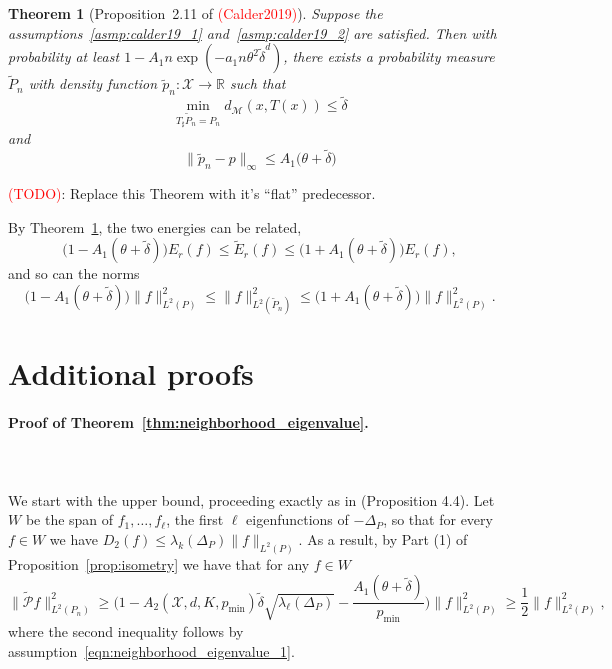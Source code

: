 \documentclass{article}
\newcommand{\Reals}{\mathbb{R}}
\newcommand{\1}{\mathbf{1}}
\newcommand{\Xset}{\mathcal{X}}
\newcommand{\Leb}{L}
\newcommand{\mc}[1]{\mathcal{#1}}
\newcommand{\wt}[1]{\widetilde{#1}}
\theoremstyle{alden}
\theoremstyle{aldenthm}
\newtheorem{theorem}{Theorem}
\theoremstyle{definition}
\theoremstyle{remark}
\begin{document}
\begin{theorem}[Proposition~2.11 of \textcolor{red}{(Calder2019)}]
	\label{thm:calder19_2}
	Suppose the assumptions~\ref{asmp:calder19_1} and~\ref{asmp:calder19_2} are satisfied. Then with probability at least $1 - A_1n\exp(-a_1n\theta^2\wt{\delta}^d)$, there exists a probability measure $\wt{P}_n$ with density function $\wt{p}_n: \Xset \to \Reals$ such that
	\begin{equation*}
	\min_{T_{\sharp}\wt{P}_n = P_n} d_{\mc{M}}(x,T(x)) \leq \wt{\delta}
	\end{equation*}
	and
	\begin{equation*}
	\bigl\|\wt{p}_n - p\bigr\|_{\infty} \leq A_1\bigl(\theta + \wt{\delta}\bigr)
	\end{equation*}
\end{theorem}
\textcolor{red}{(TODO)}: Replace this Theorem with it's ``flat'' predecessor.

By Theorem~\ref{thm:calder19_2}, the two energies can be related,
\begin{equation}
\label{eqn:calder19_1}
\bigl(1 - A_1(\theta + \wt{\delta})\bigr) E_r(f) \leq \wt{E}_r(f) \leq \bigl(1 + A_1(\theta + \wt{\delta})\bigr) E_r(f),
\end{equation}
and so can the norms
\begin{equation}
\label{eqn:calder19_2}
\bigl(1 - A_1(\theta + \wt{\delta})\bigr) \|f\|_{\Leb^2(P)}^2 \leq \|f\|_{\Leb^2(\wt{P}_n)}^2 \leq \bigl(1 + A_1(\theta + \wt{\delta})\bigr) \|f\|_{\Leb^2(P)}^2.
\end{equation}

\section{Additional proofs}

\paragraph{Proof of Theorem~\ref{thm:neighborhood_eigenvalue}.}
\mbox{} \\
\mbox{} \\
We start with the upper bound, proceeding exactly as in \citep{burago2014} (Proposition 4.4). Let $W$ be the span of $f_1,\ldots,f_{\ell}$, the first ${\ell}$ eigenfunctions of $-\Delta_P$, so that for every $f \in W$ we have $D_2(f) \leq \lambda_k(\Delta_P) \|f\|_{\Leb^2(P)}$. As a result, by Part (1) of Proposition~\ref{prop:isometry} we have that for any $f \in W$
\begin{equation*}
\bigl\|\wt{\mc{P}}f\bigr\|_{\Leb^2(P_n)}^2 \geq \biggl(1 - A_2(\Xset,d,K,p_{\min}) \wt{\delta} \sqrt{\lambda_{\ell}(\Delta_P)} - \frac{A_1(\theta + \wt{\delta})}{p_{\min}}\biggr)\|f\|_{\Leb^2(P)}^2  \geq \frac{1}{2} \|f\|_{\Leb^2(P)}^2,
\end{equation*}
where the second inequality follows by assumption~\eqref{eqn:neighborhood_eigenvalue_1}.
\end{document}
